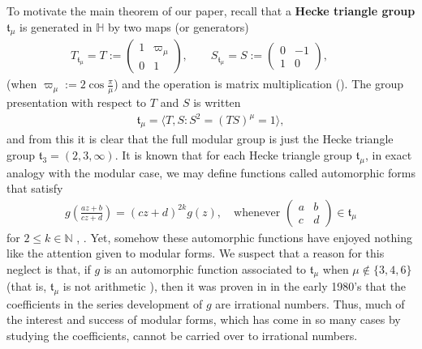 \documentclass[11pt]{article}
\begin{document}
To motivate the main theorem of our paper, recall that a \textbf{Hecke triangle group} $ \mathfrak{t}_\mu $ is generated in $ \mathbb{H} $ by two maps (or generators)
    \begin{eqnarray}\label{eq:HeckeGenerators}
          T_{\mathfrak{t}_\mu}= T := 
            \begin{pmatrix} 
                1 & \varpi_\mu \\ 0 & 1 
            \end{pmatrix}, \qquad
        S_{\mathfrak{t}_\mu} =S := 
            \begin{pmatrix}
                0 & -1 \\ 1 & 0 
            \end{pmatrix}, \qquad
    \end{eqnarray}
(when $ \varpi_{\mu} := 2 \cos \frac{\pi}{\mu} $) and the operation is matrix multiplication (\cite{beardon1983}). The group presentation with respect to $T$ and $S$ is written
    \begin{eqnarray*}
        \mathfrak{t}_\mu = \langle T, S : S^2 = (TS)^\mu = 1 \rangle,
    \end{eqnarray*}
and from this it is clear that the full modular group is just the Hecke triangle group $ \mathfrak{t}_3 = (2,3,\infty) $. It is known that for each Hecke triangle group $\mathfrak{t}_\mu $, in exact analogy with the modular case, we may define functions called automorphic forms that satisfy
    \begin{eqnarray*}
        {g\left(\frac{az +b}{cz+d}\right)} = {(cz+d)^{2k}} g(z), \quad \text{whenever } \begin{pmatrix}
            a & b\\
            c & d
        \end{pmatrix}
        \in \mathfrak{t}_\mu 
    \end{eqnarray*}
for  $ 2 \leq k \in \mathbb{N} $ \cite{doranEtAl2013}, \cite{lehner1964}. Yet, somehow these automorphic functions have enjoyed nothing like the attention given to modular forms. We suspect that a reason for this neglect is that, if $ g $ is an automorphic function associated to $ \mathfrak{t}_\mu $ when $ \mu \not \in \{3, 4, 6\} $ (that is, $ \mathfrak{t}_\mu $ is not arithmetic \cite{Takeuchi1977}), then it was proven in \cite{wolfart1983} in the early 1980's that the coefficients in the series development of $ g $ are irrational numbers. Thus, much of the interest and success of modular forms, which has come in so many cases by studying the coefficients, cannot be carried over to irrational numbers. 
\end{document}
